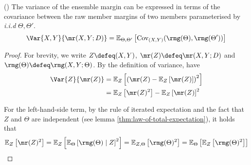 \documentclass[
	twoside=false, %
]{kaobook}
\begin{document}
\begin{theorem} (\cite{breiman_RandomForests_2001})
  \label{thm:breiman}
The variance of the ensemble margin can be expressed in terms of the covariance between the raw member margins of two members parameterised by \textit{i.i.d} $\Theta, \Theta'$.
	$$
	\Var{X,Y}{\mr(X,Y;D)} = \mathbb{E}_{\Theta, \Theta'}\left[ \text{Cov}_{(X,Y)}(\rmg(\Theta), \rmg(\Theta') ) \right] 
	$$
\end{theorem}
\begin{proof}
	For brevity, we write
	  $Z \defeq (X,Y)$,
	 $\mr(Z) \defeq \mr(X,Y;D)$ and
	 $\rmg(\Theta) \defeq \rmg(X,Y;\Theta)$.
By the definition of variance, have
\begin{align*}
\Var{Z}{\mr(Z)} &= \mathbb{E}_{Z}\left[ \left(\mr(Z) - \mathbb{E}_{Z}\left[ \mr(Z) \right]\right) ^2 \right]  \\
&= \mathbb{E}_{Z}\left[ \mr(Z)^2 \right] - \mathbb{E}_{Z}\left[ \mr(Z) \right] ^2 \\
\end{align*}

For the left-hand-side term, by the rule of iterated expectation and the fact that $Z$ and $\Theta$ are independent (see lemma \ref{thm:law-of-total-expectation}), it holds that
$$
\mathbb{E}_{Z}\left[ \mr(Z) ^2 \right]  = \mathbb{E}_{Z}\left[ \mathbb{E}_{\Theta}\left[ \rmg(\Theta) \mid Z \right] ^2  \right] = \mathbb{E}_{Z, \Theta}\left[ \rmg(\Theta)^2 \right] %
= \mathbb{E}_{\Theta}\left[ \mathbb{E}_{Z}\left[ \rmg(\Theta) ^2 \right]  \right] 
$$


\end{proof}
\end{document}
